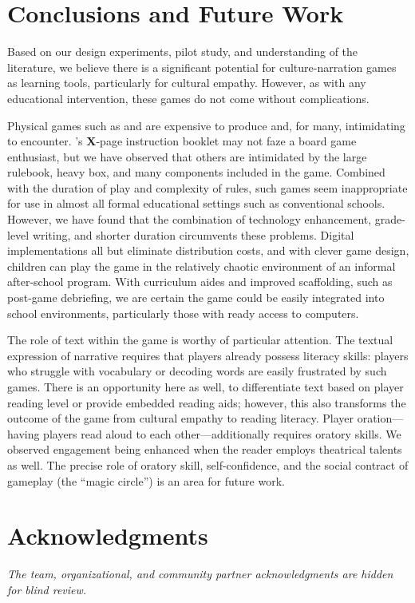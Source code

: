 \documentclass[a4paper]{article}
\begin{document}
\section{Conclusions and Future Work}

Based on our design experiments, pilot study, and understanding of the
literature, we believe there is a significant potential for
culture-narration games as learning tools, particularly for
cultural empathy.
However, as with any educational intervention, these games do not
come without complications.

Physical games such as \totan{} and \smersh{} are expensive to produce
and, for many, intimidating to encounter. \totan{}'s \textbf{X}-page
instruction booklet may not faze a board game enthusiast, but we have
observed that others are intimidated by the large rulebook, heavy box,
and many components included in the game. Combined with the duration
of play and complexity of rules, such games seem inappropriate for use
in almost all formal educational settings such as conventional
schools.  However, we have found that the combination of technology
enhancement, grade-level writing, and shorter duration circumvents
these problems.  Digital implementations all but eliminate
distribution costs, and with clever game design, children can play the
game in the relatively chaotic environment of an informal after-school
program. With curriculum aides and improved scaffolding, such as
post-game debriefing, we are certain the game could be easily
integrated into school environments, particularly those with
ready access to computers.

The role of text within the game is worthy of particular attention.
The textual expression of narrative requires that players already possess
literacy skills: players who struggle with vocabulary or decoding words
are easily frustrated by such games. There is an opportunity
here as well, to differentiate text based on player reading level
or provide embedded reading aids; however, this also transforms
the outcome of the game from cultural empathy to reading literacy.
Player oration---having players read aloud to each
other---additionally requires oratory skills. We observed engagement
being enhanced when the reader employs theatrical talents as well.
The precise role of oratory skill, self-confidence, and the social
contract of gameplay (the ``magic circle'') is an area for future work.


\section{Acknowledgments}
\textit{The team, organizational, and community partner
  acknowledgments are hidden for blind review.}



\end{document}
